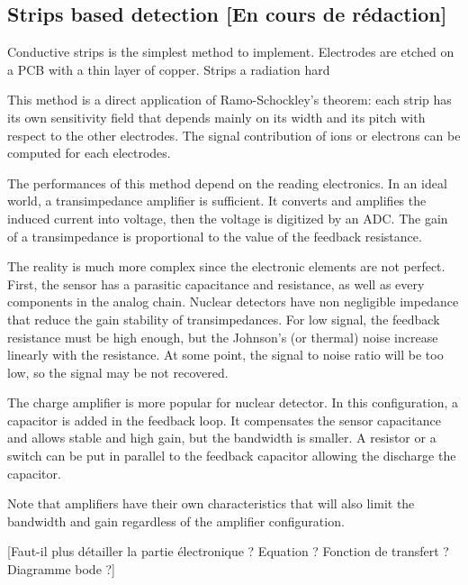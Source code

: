 \begin{refsection}

  \subsection{Strips based detection [En cours de rédaction]}
  Conductive strips is the simplest method to implement. Electrodes are etched on a PCB with a thin layer of copper. Strips a radiation hard
  
  This method is a direct application of Ramo-Schockley's theorem: each strip has its own sensitivity field that depends mainly on its width and its pitch with respect to the other electrodes. The signal contribution of ions or electrons can be computed for each electrodes.

  The performances of this method depend on the reading electronics. In an ideal world, a transimpedance amplifier is sufficient. It converts and amplifies the induced current into voltage, then the voltage is digitized by an ADC. The gain of a transimpedance is proportional to the value of the feedback resistance.

  The reality is much more complex since the electronic elements are not perfect. First, the sensor has a parasitic capacitance and resistance, as well as every components in the analog chain. Nuclear detectors have non negligible impedance that reduce the gain stability of transimpedances.
  For low signal, the feedback resistance must be high enough, but the Johnson’s (or thermal) noise increase linearly with the resistance. At some point, the signal to noise ratio will be too low, so the signal may be not recovered.

  The charge amplifier is more popular for nuclear detector. In this configuration, a capacitor is added in the feedback loop. It compensates the sensor capacitance and allows stable and high gain, but the bandwidth is smaller. A resistor or a switch can be put in parallel to the feedback capacitor allowing the discharge the capacitor.

  Note that amplifiers have their own characteristics that will also limit the bandwidth and gain regardless of the amplifier configuration.

  

  [Faut-il plus détailler la partie électronique ? Equation ? Fonction de transfert ? Diagramme bode ?]


\end{refsection}
